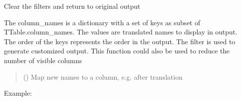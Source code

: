 \documentclass[letterpaper,10pt,english]{sphinxmanual}
\begin{document}
\begin{savenotes}
\begin{fulllineitems}
\begin{savenotes}
\begin{fulllineitems}
\end{fulllineitems}\end{savenotes}


\begin{savenotes}\begin{fulllineitems}
\label{\detokenize{eezz:eezz.table.TTable.filter_clear}}
\pysigstartsignatures
{}
\pysigstopsignatures
\sphinxAtStartPar
Clear the filters and return to original output

\end{fulllineitems}\end{savenotes}


\begin{savenotes}\begin{fulllineitems}
\label{\detokenize{eezz:eezz.table.TTable.filter_columns}}
\pysigstartsignatures
{}
\pysigstopsignatures
\sphinxAtStartPar
The column\_names is a dictionary with a set of keys as subset of TTable.column\_names.
The values are translated names to display in output. The order of the keys represents the order in the
output.
The filter is used to generate customized output. This function could also be used to reduce the number of
visible columns
\begin{quote}\begin{description}
\sphinxAtStartPar
{} (\sphinxstyleliteralemphasis{\sphinxupquote{{[}}}\sphinxstyleliteralemphasis{\sphinxupquote{{]}}}) \textendash{} Map new names to a column, e.g. after translation

\end{description}\end{quote}

\sphinxAtStartPar
Example:


\end{fulllineitems}
\end{savenotes}
\end{fulllineitems}
\end{savenotes}
\end{document}
